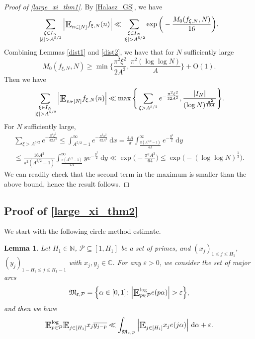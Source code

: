 \documentclass[letter,11pt]{article}
\theoremstyle{plain} %
\newtheorem{lemma}[theorem]{Lemma}
\theoremstyle{definition} %
\theoremstyle{plain}
\theoremstyle{plain}
\theoremstyle{plain}
\numberwithin{equation}{section}
\newcommand{\Oh}{{\mathrm O}}
\newcommand{\N}{\mathbb{N}}
\newcommand{\C}{\mathbb{C}}
\renewcommand{\epsilon}{\varepsilon}
\renewcommand{\leq}{\leqslant}
\renewcommand{\geq}{\geqslant}
\renewcommand{\subset}{\subseteq}
\renewcommand{\d}{~\mathrm{d}}
\newcommand{\E}{\raisebox{-0.4ex}{\scalebox{1.4}[1.3]{$\mathbb{E}$}}}
\newcommand{\Esub}[1]{\raisebox{-0.4ex}{\scalebox{1.4}[1.3]{$\mathbb{E}$}}\raisebox{-0.35ex}{\ensuremath{_{\scriptstyle #1}}}}
\newcommand{\logE}{{\E}^{\log}}
\newcommand{\1}{\mathbbm{1}}
\newcommand{\f}{f_{\xi,N}}
\newcommand{\Pc}{\mathcal{P}}
\begin{document}
\begin{proof}[Proof of \cref{large_xi_thm1}]
By \cref{Halasz_GS}, we have
$$\sum_{\substack{\xi\in I_N \\ |\xi|>A^{5/2}}}\Big|\Esub{n\in[N]} \f(n)\Big|
\ll
\sum_{\substack{\xi\in I_N \\ |\xi|>A^{5/2}}}
\exp\bigg(-\frac{M_0(\f,N)}{16}\bigg).
$$
Combining Lemmas \ref{dist1} and \ref{dist2}, we have that for $N$ sufficiently large
$$M_0(\f,N)
\geq \min\bigg\{\frac{\pi^2\xi^2}{2A^2}, \frac{\pi^2(\log\log{N})}{A}\bigg\} + \Oh(1).$$
Then we have
\begin{align*}
    \sum_{\substack{\xi\in I_N \\ |\xi|>A^{5/2}}}\Big|\Esub{n\in[N]} \f(n)\Big|
    \ll \max\Bigg\{\sum_{\xi>A^{5/2}}e^{-\frac{\pi^2\xi^2}{32A^2}}, \frac{|I_N|}{(\log{N})^\frac{\pi^2}{16A}}\Bigg\}.
\end{align*}
For $N$ sufficiently large,
\begin{multline*}
    \sum_{\xi>A^{5/2}}e^{-\frac{\pi^2\xi^2}{32A^2}} 
    \leq \int_{A^{5/2}-1}^\infty e^{-\frac{\pi^2 x^2}{32A^2}} \d x 
    = \frac{4A}{\pi} \int_{{\frac{\pi(A^{5/2}-1)}{4A}}}^\infty e^{-\frac{y^2}{2}} \d y \\
    \leq \frac{16A^2}{\pi^2(A^{5/2}-1)} \int_{{\frac{\pi(A^{5/2}-1)}{4A}}}^\infty ye^{-\frac{y^2}{2}} \d y
    \ll \exp\bigg(-\frac{\pi^2 A^3}{64}\bigg)
    \leq \exp\big(-(\log\log{N})^\frac{1}{3}\big). 
\end{multline*}
We can readily check that the second term in the maximum is smaller than the above bound, hence the result follows.
\end{proof}


\subsection{Proof of \cref{large_xi_thm2}}

We start with the following circle method estimate.

\begin{lemma}\label{circle_method}
Let $H_1\in\N$, $\Pc\subset[1,H_1]$ be a set of primes, and $(x_j)_{1\leq j\leq H_1}$, $(y_j)_{1-H_1\leq j\leq H_1-1}$ with $x_j,y_j\in\C$. 
For any $\epsilon>0$, we consider the set of major arcs 
$$\mathfrak{M}_{\epsilon,\Pc} = \Big\{\alpha\in[0,1]\colon \Big|\logE_{p\in\Pc}e(p\alpha)\Big|>\epsilon\Big\},$$
and then we have
$$\logE_{p\in\Pc}\Esub{j\in[H_1]} x_j\overline{y_{j-p}} 
\ll
\int_{\mathfrak{M}_{\epsilon,\Pc}}\Big|\Esub{j\in[H_1]} x_je(j\alpha)\Big|\d\alpha + \epsilon.$$
\end{lemma}
\end{document}
